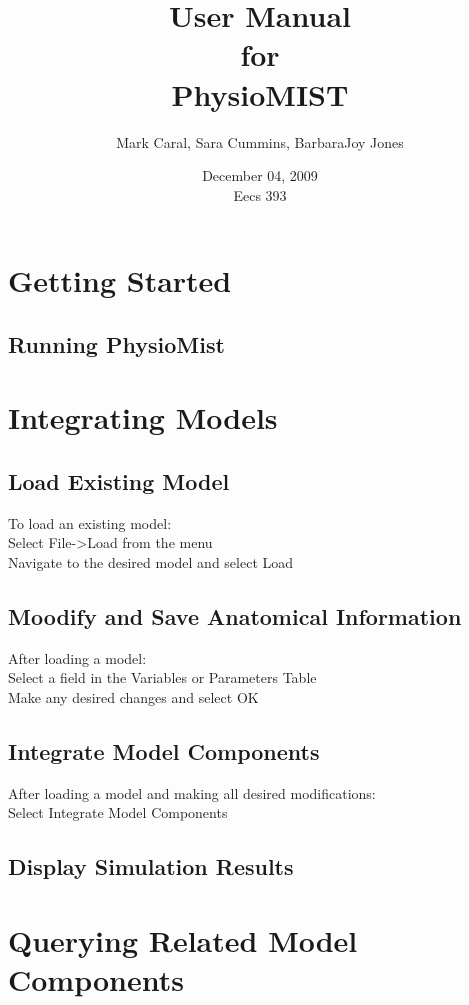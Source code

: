 \documentclass{article}
\title{User Manual\\
\bigskip
{\large for}\\
\bigskip
PhysioMIST}
\author{Mark Caral, Sara Cummins, BarbaraJoy Jones}
\date{December 04, 2009\\{\sc Eecs} 393}
\begin{document}
\begin{titlepage}
\maketitle\thispagestyle{empty}
\end{titlepage}

\tableofcontents
\newpage


\section{Getting Started}

\subsection{Running PhysioMist}

\section{Integrating Models}

\subsection{Load Existing Model}

To load an existing model: \\
Select File->Load from the menu \\
Navigate to the desired model and select Load

\subsection{Moodify and Save Anatomical Information}

After loading a model: \\
Select a field in the Variables or Parameters Table \\
Make any desired changes and select OK

\subsection{Integrate Model Components}

After loading a model and making all desired modifications: \\
Select Integrate Model Components

\subsection{Display Simulation Results}

\section{Querying Related Model Components}
\end{document}
